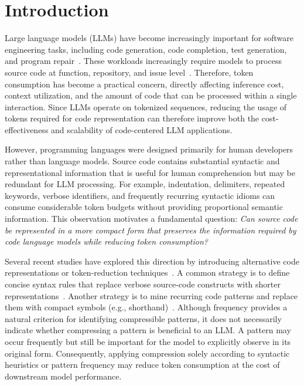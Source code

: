 
\section{Introduction}\label{sec:intro}


Large language models (LLMs) have become increasingly important for software engineering tasks, including code generation, code completion, test generation, and program repair~\cite{chen2021codex,liu2023repobench,lemieux2023codamosa,jimenez2024swebench}. These workloads increasingly require models to process source code at function, repository, and issue level~\cite{liu2023repobench,jimenez2024swebench}. Therefore, token consumption has become a practical concern, directly affecting inference cost, context utilization, and the amount of code that can be processed within a single interaction. Since LLMs operate on tokenized sequences, reducing the usage of tokens required for code representation can therefore improve both the cost-effectiveness and scalability of code-centered LLM applications.

However, programming languages were designed primarily for human developers rather than language models. Source code contains substantial syntactic and representational information that is useful for human comprehension but may be redundant for LLM processing. For example, indentation, delimiters, repeated keywords, verbose identifiers, and frequently recurring syntactic idioms can consume considerable token budgets without providing proportional semantic information. This observation motivates a fundamental question: \textit{Can source code be represented in a more compact form that preserves the information required by code language models while reducing token consumption?}



Several recent studies have explored this direction by introducing alternative code representations or token-reduction techniques~\cite{simpy2024, tokensugar2024}. A common strategy is to define concise syntax rules that replace verbose source-code constructs with shorter representations~\cite{simpy2024}. Another strategy is to mine recurring code patterns and replace them with compact symbols (e.g., shorthand)~\cite{tokensugar2024}. Although frequency provides a natural criterion for identifying compressible patterns, it does not necessarily indicate whether compressing a pattern is beneficial to an LLM. A pattern may occur frequently but still be important for the model to explicitly observe in its original form. Consequently, applying compression solely according to syntactic heuristics or pattern frequency may reduce token consumption at the cost of downstream model performance.



